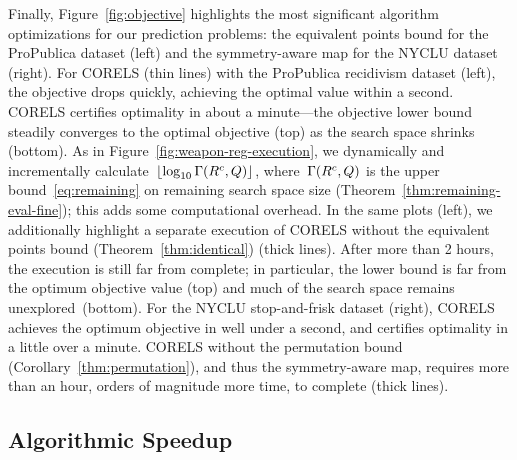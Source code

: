 Finally, Figure~\ref{fig:objective} highlights the most significant
algorithm optimizations for our prediction problems:
the equivalent points bound for the ProPublica dataset (left)
and the symmetry-aware map for the NYCLU dataset (right).
%
For CORELS (thin lines) with the ProPublica recidivism dataset (left),
the objective drops quickly, achieving the optimal value within a second.
CORELS certifies optimality in about a minute---the objective lower bound
steadily converges to the optimal objective (top) as the search space shrinks (bottom).
%
As in Figure~\ref{fig:weapon-reg-execution}, we dynamically and incrementally
calculate~$\lfloor \log_{10} \Gamma({R^c}, Q) \rfloor$,
where~$\Gamma({R^c}, Q)$
is the upper bound~\eqref{eq:remaining} on remaining search space size
(Theorem~\ref{thm:remaining-eval-fine}); this adds some computational overhead.
%
In the same plots (left), we additionally highlight
a separate execution of CORELS without the equivalent points bound
(Theorem~\ref{thm:identical}) (thick lines).
%
After more than 2 hours, the execution is still far from complete;
in particular, the lower bound is far from the optimum objective value (top)
and much of the search space remains unexplored~(bottom).
%
For the NYCLU stop-and-frisk dataset (right),
CORELS achieves the optimum objective in well under a second,
and certifies optimality in a little over a minute.
%
CORELS without the permutation bound (Corollary~\ref{thm:permutation}),
and thus the symmetry-aware map,
requires more than an hour, \ie orders of magnitude more time, to complete (thick lines).

\subsection{Algorithmic Speedup}
\label{sec:speedup}

